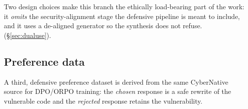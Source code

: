 

Two design choices make this branch the ethically load-bearing part of the
work: it \emph{omits} the security-alignment stage the defensive pipeline is
meant to include, and it uses a de-aligned generator so the synthesis does not
refuse. (\S\ref{sec:dualuse}).

\subsection{Preference data}

A third, defensive preference dataset is derived from the same CyberNative
source for DPO/ORPO training: the \emph{chosen} response is a safe rewrite of
the vulnerable code and the \emph{rejected} response retains the
vulnerability.

